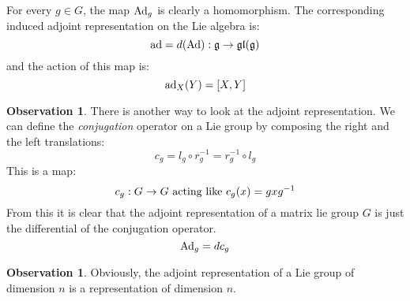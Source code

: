 \documentclass[12pt,a4paper]{report}
\theoremstyle{definition}
\theoremstyle{Theorem}
\theoremstyle{definition}
\theoremstyle{definition}
\newtheorem{Obs}[Def]{Observation}
\begin{document}
	For every $g\in G$, the map $\hbox{Ad}_g$ is clearly a homomorphism. The corresponding induced adjoint representation on the Lie algebra is:
	$$\hbox{ad}=d(\hbox{Ad}):\mathfrak{g}\rightarrow\mathfrak{gl(g)}$$
	and the action of this map is:
	$$\hbox{ad}_X(Y)=[X,Y]$$
	\begin{Obs}
		There is another way to look at the adjoint representation. We can define the \textit{conjugation} operator on a Lie group by composing the right and the left translations:
		$$c_g=l_g\circ r_g^{-1}=r_g^{-1}\circ l_g$$
		This is a map:
		$$c_g:G\rightarrow G\hbox{ acting like } c_g(x)=gxg^{-1}$$
		From this it is clear that the adjoint representation of a matrix lie group $G$ is just the differential of the conjugation operator.
		$$\hbox{Ad}_g=dc_g$$
	\end{Obs}
	\begin{Obs}
		Obviously, the adjoint representation of a Lie group of dimension $n$ is a representation of dimension $n$.
	\end{Obs}
\end{document}
